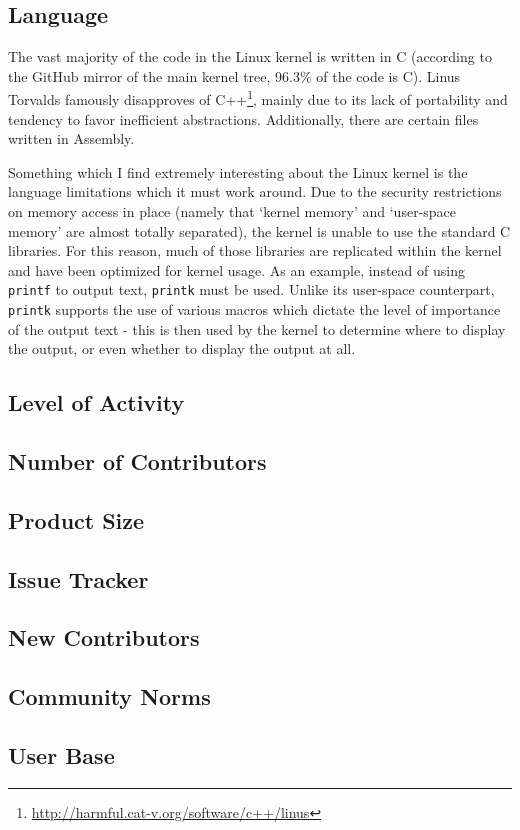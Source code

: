 \documentclass[11pt]{article}
\begin{document}
\subsection{Language}
\label{subsec:kernel_language}

The vast majority of the code in the Linux kernel is written in C (according to the GitHub mirror of the main kernel tree, 96.3\% of the code is C).  Linus Torvalds famously disapproves of C++\footnote{\url{http://harmful.cat-v.org/software/c++/linus}}, mainly due to its lack of portability and tendency to favor inefficient abstractions.  Additionally, there are certain files written in Assembly.

Something which I find extremely interesting about the Linux kernel is the language limitations which it must work around.  Due to the security restrictions on memory access in place (namely that `kernel memory' and `user-space memory' are almost totally separated), the kernel is unable to use the standard C libraries.  For this reason, much of those libraries are replicated within the kernel and have been optimized for kernel usage.  As an example, instead of using \texttt{printf} to output text, \texttt{printk} must be used.  Unlike its user-space counterpart, \texttt{printk} supports the use of various macros which dictate the level of importance of the output text - this is then used by the kernel to determine where to display the output, or even whether to display the output at all.

\subsection{Level of Activity}
\label{subsec:kernel_activity}

\subsection{Number of Contributors}
\label{subsec:kernel_contributors}

\subsection{Product Size}
\label{subsec:kernel_codebase}

\subsection{Issue Tracker}
\label{subsec:kernel_issue_tracker}

\subsection{New Contributors}
\label{subsec:kernel_newbies}

\subsection{Community Norms}
\label{subsec:kernel_community}

\subsection{User Base}
\label{subsec:kernel_users}
\end{document}
